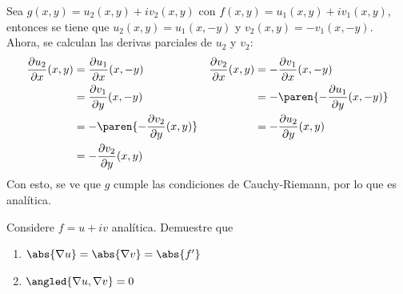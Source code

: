 \documentclass{homework}
\begin{document}
\begin{sol}
    Sea \(g(x,y)=u_2(x,y)+iv_2(x,y)\) con \(f(x,y)=u_1(x,y)+iv_1(x,y)\), entonces se tiene que \(u_2(x,y)=u_1(x,-y)\) y \(v_2(x,y)=-v_1(x,-y)\). Ahora, se calculan las derivas parciales de \(u_2\) y \(v_2\):
    \begin{align*}
        \frac{\partial u_2}{\partial x}(x,y) & =\frac{\partial u_1}{\partial x}(x,-y)          & \frac{\partial v_2}{\partial x}(x,y) & =-\frac{\partial v_1}{\partial x}(x,-y)          \\
                                             & =\frac{\partial v_1}{\partial y}(x,-y)          &                                      & =-\paren{-\frac{\partial u_1}{\partial y}(x,-y)} \\
                                             & =-\paren{-\frac{\partial v_2}{\partial y}(x,y)} &                                      & =-\frac{\partial u_2}{\partial y}(x,y)           \\
                                             & =-\frac{\partial v_2}{\partial y}(x,y)          &                                      &
    \end{align*}
    Con esto, se ve que \(g\) cumple las condiciones de Cauchy-Riemann, por lo que es analítica.
\end{sol}

\begin{prob}
    Considere \(f=u+iv\) analítica. Demuestre que
    \begin{enumerate}[label=(\alph*)]
        \item \(\abs{\nabla u}=\abs{\nabla v}=\abs{f'}\)
        \item \(\angled{\nabla u,\nabla v}=0\)
    \end{enumerate}
\end{prob}
\end{document}
